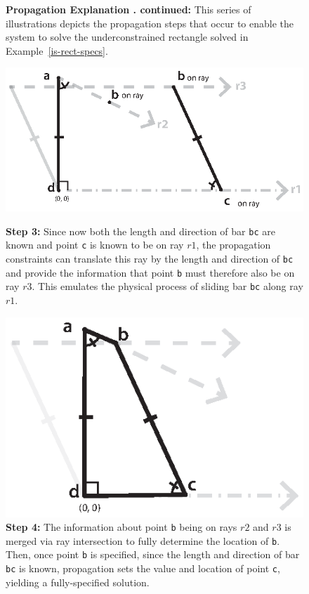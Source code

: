 \newpage
\begin{figure}[h]
\captionsetup{labelformat=empty}
\caption{{\bf Propagation Explanation
    . continued:} This series of
  illustrations depicts the propagation steps that occur to enable the
  system to solve the underconstrained rectangle solved in
  Example~\ref{is-rect-specs}.}
\centering
\includegraphics[width=.95\textwidth]{diagrams/is-rect-explained-boards-3.eps}
\caption{{\bf Step 3:} Since now both the length and direction of bar
  \texttt{bc} are known and point \texttt{c} is known to be on ray
  $r1$, the propagation constraints can translate this ray by the
  length and direction of \texttt{bc} and provide the information that
  point \texttt{b} must therefore also be on ray $r3$. This emulates
  the physical process of sliding bar \texttt{bc} along ray $r1$.}
\includegraphics[width=.95\textwidth]{diagrams/is-rect-explained-boards-4.eps}
\caption{{\bf Step 4:} The information about point \texttt{b} being on
  rays $r2$ and $r3$ is merged via ray intersection to fully determine
  the location of \texttt{b}. Then, once point \texttt{b} is
  specified, since the length and direction of bar \texttt{bc} is
  known, propagation sets the value and location of point \texttt{c},
  yielding a fully-specified solution.}
\vspace{-1.5em}
\end{figure}
